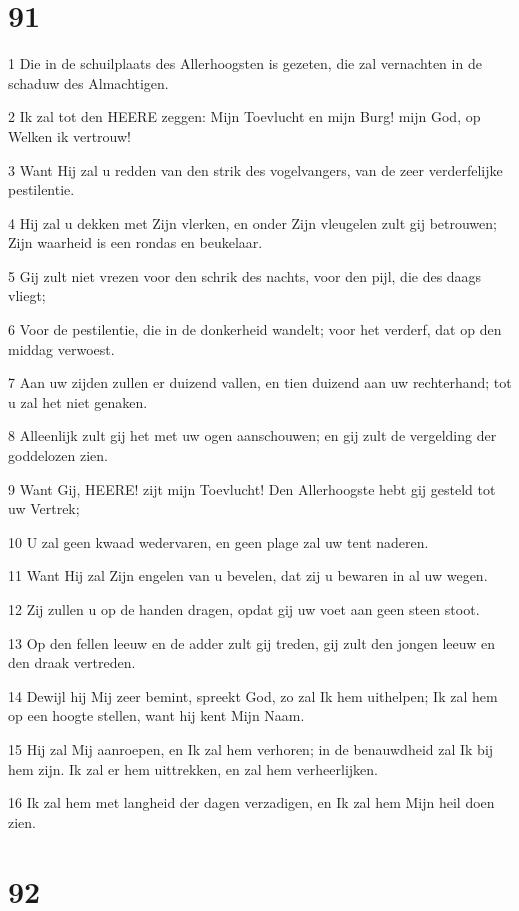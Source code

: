 \chapter{91}

\par 1 Die in de schuilplaats des Allerhoogsten is gezeten, die zal vernachten in de schaduw des Almachtigen.
\par 2 Ik zal tot den HEERE zeggen: Mijn Toevlucht en mijn Burg! mijn God, op Welken ik vertrouw!
\par 3 Want Hij zal u redden van den strik des vogelvangers, van de zeer verderfelijke pestilentie.
\par 4 Hij zal u dekken met Zijn vlerken, en onder Zijn vleugelen zult gij betrouwen; Zijn waarheid is een rondas en beukelaar.
\par 5 Gij zult niet vrezen voor den schrik des nachts, voor den pijl, die des daags vliegt;
\par 6 Voor de pestilentie, die in de donkerheid wandelt; voor het verderf, dat op den middag verwoest.
\par 7 Aan uw zijden zullen er duizend vallen, en tien duizend aan uw rechterhand; tot u zal het niet genaken.
\par 8 Alleenlijk zult gij het met uw ogen aanschouwen; en gij zult de vergelding der goddelozen zien.
\par 9 Want Gij, HEERE! zijt mijn Toevlucht! Den Allerhoogste hebt gij gesteld tot uw Vertrek;
\par 10 U zal geen kwaad wedervaren, en geen plage zal uw tent naderen.
\par 11 Want Hij zal Zijn engelen van u bevelen, dat zij u bewaren in al uw wegen.
\par 12 Zij zullen u op de handen dragen, opdat gij uw voet aan geen steen stoot.
\par 13 Op den fellen leeuw en de adder zult gij treden, gij zult den jongen leeuw en den draak vertreden.
\par 14 Dewijl hij Mij zeer bemint, spreekt God, zo zal Ik hem uithelpen; Ik zal hem op een hoogte stellen, want hij kent Mijn Naam.
\par 15 Hij zal Mij aanroepen, en Ik zal hem verhoren; in de benauwdheid zal Ik bij hem zijn. Ik zal er hem uittrekken, en zal hem verheerlijken.
\par 16 Ik zal hem met langheid der dagen verzadigen, en Ik zal hem Mijn heil doen zien.

\chapter{92}

